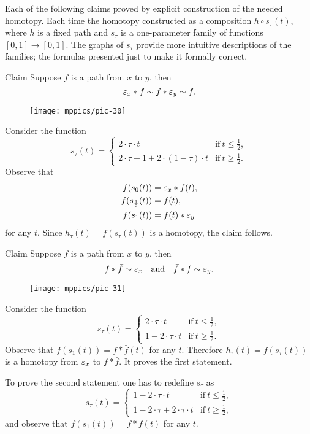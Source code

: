Each of the following claims proved by explicit construction of the needed homotopy.
Each time the homotopy constructed as a composition $h\circ s_\tau(t)$, where $h$ is a fixed path and  $s_\tau$ is a one-parameter family of functions $[0,1]\to [0,1]$.
The graphs of $s_\tau$ provide more intuitive descriptions of the families;
the formulas presented just to make it formally correct.

\begin{thm}{Claim}\label{clm:neutral}
Suppose $f$ is a path from $x$ to $y$, then
\[\varepsilon_x*f\sim f*\varepsilon_y\sim  f.\]
\end{thm}

\begin{wrapfigure}[4]{r}{30mm}
\centering
\vskip-5mm
\texttt{[image: mppics/pic-30]}
\end{wrapfigure}

Consider the function
\[s_\tau(t)=
\begin{cases}
2\cdot \tau \cdot t&\text{if}\ t\le \tfrac12,
\\
2\cdot\tau-1+2\cdot (1-\tau) \cdot t&\text{if}\ t\ge \tfrac12.
\end{cases}
\]
Observe that 
\begin{align*}
f(s_0(t))&=\varepsilon_x*f(t),
\\
f(s_{\frac12}(t))&=f(t),
\\
f(s_1(t))&=f(t)*\varepsilon_y
\end{align*}
for any $t$.
Since $h_\tau(t)=f(s_\tau(t))$ is a homotopy, the claim follows.
\qeds

\begin{thm}{Claim}\label{clm:f-bar-f}
Suppose $f$ is a path from $x$ to $y$, then
\[f*\bar f\sim \varepsilon_x
\quad\text{and}\quad
\bar f*f\sim \varepsilon_y.\]
\end{thm}

{

\begin{wrapfigure}[12]{r}{30mm}
\centering
\texttt{[image: mppics/pic-31]}
\end{wrapfigure}

Consider the function
\[s_\tau(t)=
\begin{cases}
2\cdot \tau \cdot t&\text{if}\ t\le \tfrac12,
\\
1-2\cdot \tau \cdot t&\text{if}\ t\ge \tfrac12.
\end{cases}
\]
Observe that $f(s_1(t))=f*\bar f(t)$ for any $t$.
Therefore $h_\tau(t)=f(s_\tau(t))$ is a homotopy from $\varepsilon_x$ to $f*\bar f$.
It proves the first statement.



To prove the second statement one has to redefine $s_\tau$ as
\[s_\tau(t)=
\begin{cases}
1-2\cdot \tau \cdot t&\text{if}\ t\le \tfrac12,
\\
1-2\cdot\tau + 2\cdot \tau \cdot t&\text{if}\ t\ge \tfrac12,
\end{cases}
\]
and observe that $f(s_1(t))=\bar f*f(t)$ for any $t$.
\qeds

}

